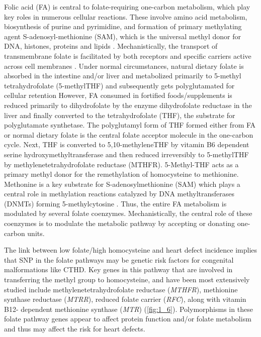 \begin{refsection}
\begin{sloppypar} Folic acid (FA) is central to folate-requiring one-carbon metabolism, which play key roles in numerous cellular reactions. These involve amino acid metabolism, biosynthesis of purine and pyrimidine, and formation of primary methylating agent S-adenosyl-methionine (SAM), which is the universal methyl donor for DNA, histones, proteins and lipids \cite{boot2004cardiac}. Mechanistically, the transport of transmembrane folate is facilitated by both receptors and specific carriers active across cell membranes \cite{fowler2001folate}. Under normal circumstances, natural dietary folate is absorbed in the intestine and/or liver and metabolized primarily to 5-methyl tetrahydrofolate (5-methylTHF) and subsequently gets polyglutamated for cellular retention However, FA consumed in fortified foods/supplements is reduced primarily to dihydrofolate by the enzyme dihydrofolate reductase in the liver and finally converted to the tetrahydrofolate (THF), the substrate for polyglutamate synthetase. The polyglutamyl form of THF formed either from FA or normal dietary folate is the central folate acceptor molecule in the one-carbon cycle. Next, THF is converted to 5,10-methyleneTHF by vitamin B6 dependent serine hydroxymethyltransferase and then reduced irreversibly to 5-methylTHF by methylenetetrahydrofolate reductase (MTHFR). 5-Methyl-THF acts as a primary methyl donor for the remethylation of homocysteine to methionine. Methonine is a key substrate for S-adenosylmethionine (SAM) which plays a central role in methylation reactions catalyzed by DNA methyltransferases (DNMTs) forming 5-methylcytosine \cite{stanger2002physiology,crider2012folate,hubner2009folate,liu20104,zhang2013genetic}. Thus, the entire FA metabolism is modulated by several folate coenzymes. Mechanistically, the central role of these coenzymes is to modulate the metabolic pathway by accepting or donating one-carbon units. \end{sloppypar}

The link between low folate/high homocysteine and heart defect incidence implies that SNP in the folate pathways may be genetic risk factors for congenital malformations like CTHD. Key genes in this pathway that are involved in transferring the methyl group to homocysteine, and have been most extensively studied include methylenetetrahydrofolate reductase (\textit{MTHFR}), methionine synthase reductase (\textit{MTRR}), reduced folate carrier (\textit{RFC}), along with vitamin B12- dependent methionine synthase (\textit{MTR}) \cite{zhang2013genetic} (\cref{fig:1_6}). Polymorphisms in these folate pathway genes appear to affect protein function and/or folate metabolism and thus may affect the risk for heart defects. 


\end{refsection}
